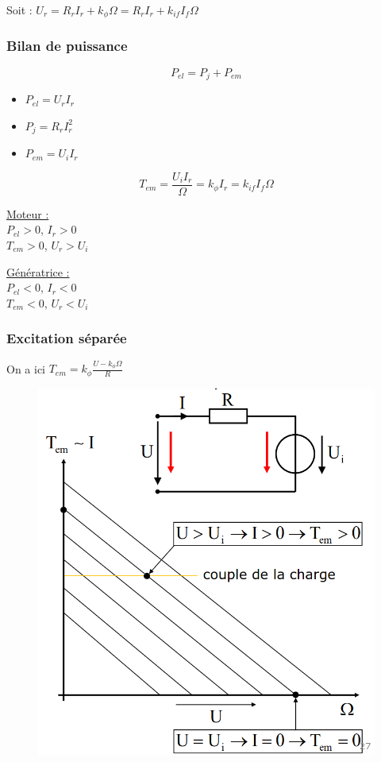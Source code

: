 \documentclass[../main.tex]{subfiles}
\begin{document}
Soit : $U_r = R_r I_r + k_\phi \Omega = R_r I_r + k_{if} I_f \Omega$\\

\subsubsection{Bilan de puissance}
\begin{equation}
    P_{el} = P_j + P_{em}
\end{equation}

\begin{itemize}
    \item $P_{el} = U_rI_r$\\
    \item $P_j = R_rI_r^2$\\
    \item $P_{em} = U_iI_r$\\
\end{itemize}

\begin{equation}
    T_{em} = \frac{U_iI_r}{\Omega} = k_\phi I_r = k_{if}I_f \Omega
\end{equation}

\begin{minipage}{.5\textwidth}
    \underline{Moteur :}\\
    $P_{el} >0$, $I_r >0$\\
    $T_{em} > 0$, $U_r > U_i$\\
\end{minipage}
\vline
\begin{minipage}{.5\textwidth}
    \underline{Génératrice :}\\
    $P_{el} < 0$, $I_r < 0$\\
    $T_{em} < 0$, $U_r < U_i$\\
\end{minipage}

\subsubsection{Excitation séparée}
On a ici $T_{em} = k_\phi \frac{U-k_\phi \Omega}{R}$\\

\begin{figure}[hbt!]
    \centering
    \includegraphics[width=.5\textwidth]{IMAGES/elec/excitationsep.png}
\end{figure}
\end{document}
